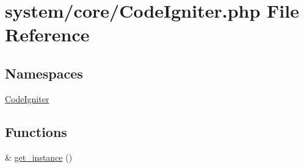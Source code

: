 \hypertarget{_code_igniter_8php}{\section{system/core/\-Code\-Igniter.php File Reference}
\label{_code_igniter_8php}
}
\subsection*{Namespaces}
\begin{DoxyCompactItemize}
\item 
\hyperlink{namespace_code_igniter}{Code\-Igniter}
\end{DoxyCompactItemize}
\subsection*{Functions}
\begin{DoxyCompactItemize}
\item 
\& \hyperlink{_code_igniter_8php_a185483844bd20a0e80955460d66d2199}{get\-\_\-instance} ()
\end{DoxyCompactItemize}

